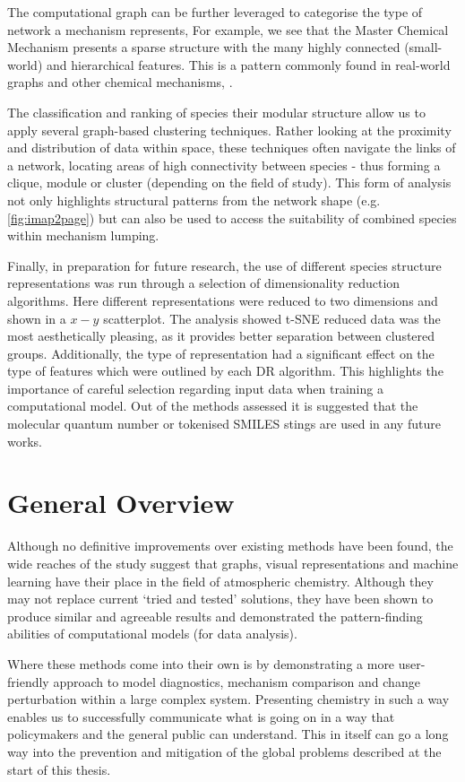 The computational graph can be further leveraged to categorise the type of network a mechanism represents, For example, we see that the Master Chemical Mechanism presents a sparse structure with the many highly connected (small-world) and hierarchical features. This is a pattern commonly found in real-world graphs and other chemical mechanisms, \citep{smallworld,rscgraph}.

The classification and ranking of species their modular structure allow us to apply several graph-based clustering techniques. Rather looking at the proximity and distribution of data within space, these techniques often navigate the links of a network, locating areas of high connectivity between species - thus forming a clique, module or cluster (depending on the field of study). This form of analysis not only highlights structural patterns from the network shape (e.g. \autoref{fig:imap2page}) but can also be used to access the suitability of combined species within mechanism lumping.

Finally, in preparation for future research, the use of different species structure representations was run through a selection of dimensionality reduction algorithms. Here different representations were reduced to two dimensions and shown in a $x-y$ scatterplot. The analysis showed t-SNE reduced data was the most aesthetically pleasing, as it provides better separation between clustered groups. Additionally, the type of representation had a significant effect on the type of features which were outlined by each DR algorithm. This highlights the importance of careful selection regarding input data when training a computational model. Out of the methods assessed it is suggested that the molecular quantum number or tokenised SMILES stings are used in any future works.

\newpage

\section{General Overview}
Although no definitive improvements over existing methods have been found, the wide reaches of the study suggest that graphs, visual representations and machine learning have their place in the field of atmospheric chemistry. Although they may not replace current `tried and tested' solutions, they have been shown to produce similar and agreeable results and demonstrated the pattern-finding abilities of computational models (for data analysis).

Where these methods come into their own is by demonstrating a more user-friendly approach to model diagnostics, mechanism comparison and change perturbation within a large complex system. Presenting chemistry in such a way enables us to successfully communicate what is going on in a way that policymakers and the general public can understand. This in itself can go a long way into the prevention and mitigation of the global problems described at the start of this thesis.



